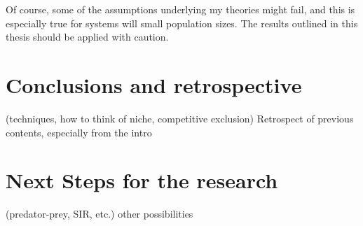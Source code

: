 Of course, some of the assumptions underlying my theories might fail, and this is especially true for systems will small population sizes. 
The results outlined in this thesis should be applied with caution. 



\section{Conclusions and retrospective}
 (techniques, how to think of niche, competitive exclusion)
Retrospect of previous contents, especially from the intro


\section{Next Steps for the research}
 (predator-prey, SIR, etc.)
 other possibilities

